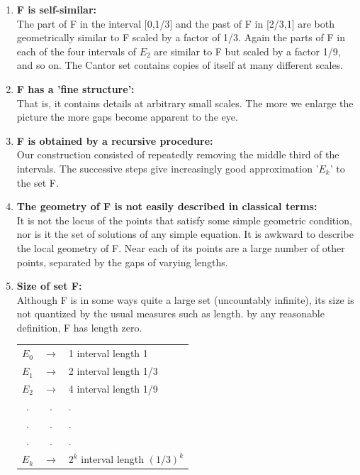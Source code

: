 \documentclass[14pt]{extarticle}
\begin{document}
\begin{enumerate}
\item  \textbf{F is self-similar:}\\
The part of F in the interval [0,1/3] and the past of F in [2/3,1] are both geometrically similar to F scaled by a factor of 1/3. Again the parts of F in each of the four intervals of $E_2$ are similar to F but scaled by a factor 1/9, and so on. The Cantor set contains copies of itself at many different scales.
\item \textbf{F has a 'fine structure':}\\
That is, it contains details at arbitrary small scales. The more we enlarge the picture the more gaps become apparent to the eye.

\item \textbf{F is obtained by a recursive procedure:}\\
Our construction consisted of repeatedly removing the middle third of the intervals. The successive steps give increasingly good approximation '$E_k$' to the set F.

\item \textbf{The geometry of F is not easily described in classical terms:}\\
It is not the locus of the points that satisfy some simple geometric condition, nor is it the set of solutions of any simple equation. It is awkward to describe the local geometry of F. Near each of its points are a large number of other points, separated by the gaps of varying lengths.

\item \textbf{Size of set F:}\\
Although F is in some ways quite a large set (uncountably infinite), its size is not quantized by the usual measures such as length. by any reasonable definition, F has length zero.
\begin{center}

\begin{tabular}{ccl}

$E_0$&$\rightarrow$ & 1 interval length 1   \\
$E_1$&$\rightarrow$ & 2 interval length 1/3 \\
$E_2$&$\rightarrow$ & 4 interval length 1/9 \\
.&. &.\\
.&. &.\\
.&. &.\\
$E_k$ &$\rightarrow$ & $2^k$ interval   length $(1/3)^k$\\



\end{tabular}
\end{center}
\end{enumerate}
\end{document}
